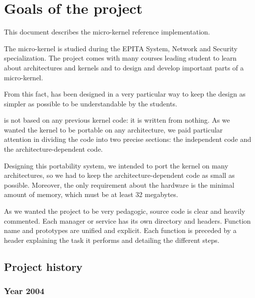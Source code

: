 
%
%

\chapter{Goals of the \kaneton project}

\newpage

This   document   describes   the  \kaneton   micro-kernel   reference
implementation.

The \kaneton micro-kernel is  studied during the EPITA System, Network
and  Security specialization.   The  project comes  with many  courses
leading student to learn about architectures and kernels and to design
and develop important parts of a micro-kernel.

From this fact, \kaneton has been designed in a very particular way to
keep the  design as  simpler as possible  to be understandable  by the
students.

\kaneton is not based on any previous kernel code: it is written from
nothing. As we  wanted the kernel to be  portable on any architecture,
we paid  particular attention  in dividing the  code into  two precise
sections: the independent code and the architecture-dependent code.

Designing this portability  system, we intended to port  the kernel on
many architectures, so we  had to keep the architecture-dependent code
as  small  as possible.   Moreover,  the  only  requirement about  the
hardware is  the minimal amount of  memory, which must be  at least 32
megabytes.

As we wanted the project to be very pedagogic, \kaneton source code is
clear  and heavily  commented. Each  manager  or service  has its  own
directory and  headers. Function name  and prototypes are  unified and
explicit. Each function is preceded by a header explaining the task it
performs and detailing the different steps.

\section*{Project history}

\subsection*{Year 2004}

